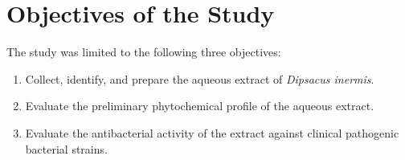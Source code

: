 
\chapter{Objectives of the Study}
\label{ch:objectives}

The study was limited to the following three objectives:

\begin{enumerate}
  \item Collect, identify, and prepare the aqueous extract of \textit{Dipsacus inermis}.
  \item Evaluate the preliminary phytochemical profile of the aqueous extract.
  \item Evaluate the antibacterial activity of the extract against clinical pathogenic bacterial strains.
\end{enumerate}
